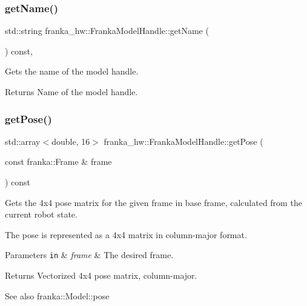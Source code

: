 \subsubsection{\texorpdfstring{get\+Name()}{getName()}}
{\footnotesize\ttfamily std\+::string franka\+\_\+hw\+::\+Franka\+Model\+Handle\+::get\+Name (\begin{DoxyParamCaption}{ }\end{DoxyParamCaption}) const\hspace{0.3cm}{\ttfamily [inline]}, {\ttfamily [noexcept]}}

Gets the name of the model handle.

\begin{DoxyReturn}{Returns}
Name of the model handle. 
\end{DoxyReturn}
\mbox{\label{classfranka__hw_1_1_franka_model_handle_af6617a4a3a89908c4a0aa8d25b2bfc07}} 
\subsubsection{\texorpdfstring{get\+Pose()}{getPose()}\hspace{0.1cm}{\footnotesize\ttfamily [1/2]}}
{\footnotesize\ttfamily std\+::array$<$double, 16$>$ franka\+\_\+hw\+::\+Franka\+Model\+Handle\+::get\+Pose (\begin{DoxyParamCaption}\item[{const franka\+::\+Frame \&}]{frame }\end{DoxyParamCaption}) const\hspace{0.3cm}{\ttfamily [inline]}}

Gets the 4x4 pose matrix for the given frame in base frame, calculated from the current robot state.

The pose is represented as a 4x4 matrix in column-\/major format.


\begin{DoxyParams}[1]{Parameters}
\mbox{\tt in}  & {\em frame} & The desired frame.\\
\hline
\end{DoxyParams}
\begin{DoxyReturn}{Returns}
Vectorized 4x4 pose matrix, column-\/major.
\end{DoxyReturn}
\begin{DoxySeeAlso}{See also}
franka\+::\+Model\+::pose 
\end{DoxySeeAlso}
\mbox{\label{classfranka__hw_1_1_franka_model_handle_aa5f4161223cf728ad3ca1bf48768df50}} 
